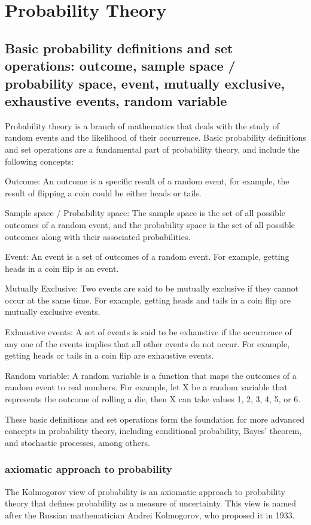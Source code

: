 \documentclass[12pt, a4paper, oneside]{article}
\begin{document}
\section{Probability Theory}
\subsection{ Basic probability definitions and set operations: outcome, sample space / probability space, event, mutually exclusive, exhaustive events, random variable  }
Probability theory is a branch of mathematics that deals with the study of random events and the likelihood of their occurrence. Basic probability definitions and set operations are a fundamental part of probability theory, and include the following concepts:

Outcome: An outcome is a specific result of a random event, for example, the result of flipping a coin could be either heads or tails.

Sample space / Probability space: The sample space is the set of all possible outcomes of a random event, and the probability space is the set of all possible outcomes along with their associated probabilities.

Event: An event is a set of outcomes of a random event. For example, getting heads in a coin flip is an event.

Mutually Exclusive: Two events are said to be mutually exclusive if they cannot occur at the same time. For example, getting heads and tails in a coin flip are mutually exclusive events.

Exhaustive events: A set of events is said to be exhaustive if the occurrence of any one of the events implies that all other events do not occur. For example, getting heads or tails in a coin flip are exhaustive events.

Random variable: A random variable is a function that maps the outcomes of a random event to real numbers. For example, let X be a random variable that represents the outcome of rolling a die, then X can take values 1, 2, 3, 4, 5, or 6.

These basic definitions and set operations form the foundation for more advanced concepts in probability theory, including conditional probability, Bayes' theorem, and stochastic processes, among others.
\subsubsection{axiomatic approach to probability}
The Kolmogorov view of probability is an axiomatic approach to probability theory that defines probability as a measure of uncertainty. This view is named after the Russian mathematician Andrei Kolmogorov, who proposed it in 1933.
\end{document}
